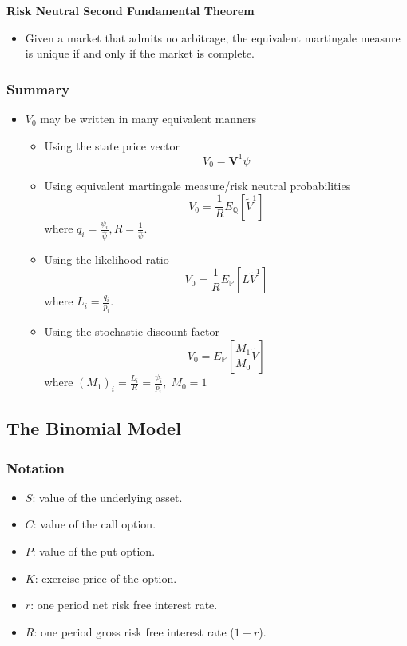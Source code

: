 \documentclass[11pt]{article}
\begin{document}
\textbf{Risk Neutral Second Fundamental Theorem}
\begin{itemize}
    \item Given a market that admits no arbitrage, the equivalent martingale measure is unique 
    if and only if the market is complete.
\end{itemize}

\subsubsection{Summary}

\begin{itemize}
    \item $V_0$ may be written in many equivalent manners 
    \begin{itemize}
        \item Using the state price vector 
        \[V_0 = \boldsymbol{V}^1 \psi\]
        \item Using equivalent martingale measure/risk neutral probabilities 
        \[V_0 = \frac{1}{R} E_{\mathbb{Q}}[\tilde{V}^1]\]
        where $q_i = \frac{\psi_i}{\hat{\psi}}, R = \frac{1}{\hat{\psi}}$.
        \item Using the likelihood ratio 
        \[V_0 = \frac{1}{R} E_{\mathbb{P}}[L\tilde{V}^1]\]
        where $L_i = \frac{q_i}{p_i}$.
        \item Using the stochastic discount factor 
        \[V_0 = E_{\mathbb{P}}\left[\frac{M_1}{M_0}\tilde{V}\right]\]
        where ${(M_1)}_i = \frac{L_i}{R} = \frac{\psi_i}{p_i}, \; M_0 = 1$
    \end{itemize}
    
\end{itemize}

\subsection{The Binomial Model}

\subsubsection{Notation}
\begin{itemize}
    \item $S$: value of the underlying asset.
    \item $C$: value of the call option.
    \item $P$: value of the put option.
    \item $K$: exercise price of the option.
    \item $r$: one period net risk free interest rate.
    \item $R$: one period gross risk free interest rate ($1+r$).
\end{itemize}
\end{document}
